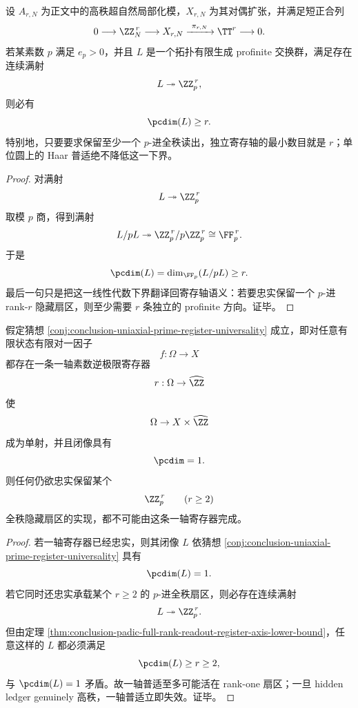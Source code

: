 \begin{theorem}\label{thm:conclusion-padic-full-rank-readout-register-axis-lower-bound}
设 \(A_{r,N}\) 为正文中的高秩超自然局部化模，\(X_{r,N}\) 为其对偶扩张，并满足短正合列
\[
0\longrightarrow \ZZ_N^{\,r}\longrightarrow X_{r,N}\xrightarrow{\ \pi_{r,N}\ }\TT^r\longrightarrow 0.
\]
若某素数 \(p\) 满足 \(e_p>0\)，并且 \(L\) 是一个拓扑有限生成 profinite 交换群，满足存在连续满射
\[
L\twoheadrightarrow \ZZ_p^{\,r},
\]
则必有
\[
\pcdim(L)\ge r.
\]
特别地，只要要求保留至少一个 \(p\)-进全秩读出，独立寄存轴的最小数目就是 \(r\)；单位圆上的 Haar 普适绝不降低这一下界。
\end{theorem}
\begin{proof}
对满射
\[
L\twoheadrightarrow \ZZ_p^{\,r}
\]
取模 \(p\) 商，得到满射
\[
L/pL\twoheadrightarrow \ZZ_p^{\,r}/p\ZZ_p^{\,r}\cong \FF_p^{\,r}.
\]
于是
\[
\pcdim(L)=\dim_{\FF_p}(L/pL)\ge r.
\]
最后一句只是把这一线性代数下界翻译回寄存轴语义：若要忠实保留一个 \(p\)-进 rank-\(r\) 隐藏扇区，则至少需要 \(r\) 条独立的 profinite 方向。证毕。
\end{proof}

\begin{theorem}[一轴素数寄存普适性与高秩忠实扇区的互斥]\label{thm:conclusion-uniaxial-prime-register-universality-incompatible-high-rank-faithfulness}
假定猜想 \ref{conj:conclusion-uniaxial-prime-register-universality} 成立，即对任意有限状态有限对一因子
\[
f:\Omega\to X
\]
都存在一条一轴素数逆极限寄存器
\[
r:\Omega\to \widehat{\ZZ}
\]
使
\[
\Omega\to X\times \widehat{\ZZ}
\]
成为单射，并且闭像具有
\[
\pcdim=1.
\]
则任何仍欲忠实保留某个
\[
\ZZ_p^{\,r}\qquad (r\ge 2)
\]
全秩隐藏扇区的实现，都不可能由这条一轴寄存器完成。
\end{theorem}
\begin{proof}
若一轴寄存器已经忠实，则其闭像 \(L\) 依猜想 \ref{conj:conclusion-uniaxial-prime-register-universality} 具有
\[
\pcdim(L)=1.
\]
若它同时还忠实承载某个 \(r\ge 2\) 的 \(p\)-进全秩扇区，则必存在连续满射
\[
L\twoheadrightarrow \ZZ_p^{\,r}.
\]
但由定理 \ref{thm:conclusion-padic-full-rank-readout-register-axis-lower-bound}，任意这样的 \(L\) 都必须满足
\[
\pcdim(L)\ge r\ge 2,
\]
与 \(\pcdim(L)=1\) 矛盾。故一轴普适至多可能活在 rank-one 扇区；一旦 hidden ledger genuinely 高秩，一轴普适立即失效。证毕。
\end{proof}

